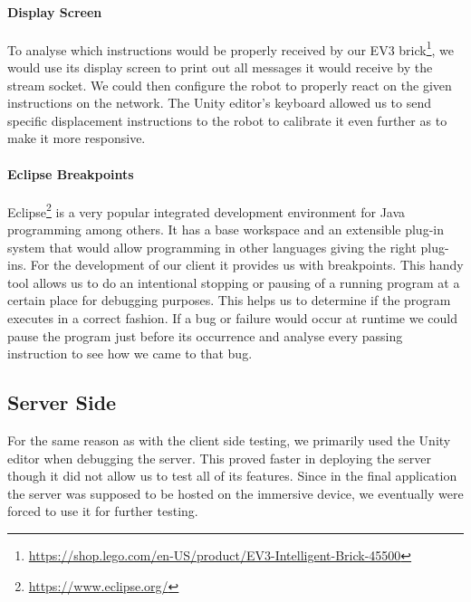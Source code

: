 \paragraph{Display Screen}
To analyse which instructions would be properly received by our EV3 brick\footnote{\protect\url{https://shop.lego.com/en-US/product/EV3-Intelligent-Brick-45500}}, we would use its display screen to print out all messages it would receive by the stream socket. We could then configure the robot to properly react on the given instructions on the network. The Unity editor's keyboard allowed us to send specific displacement instructions to the robot to calibrate it even further as to make it more responsive. 

\paragraph{Eclipse Breakpoints}
Eclipse\footnote{\protect\url{https://www.eclipse.org/}} is a very popular integrated development environment for Java programming among others. It has a base workspace and an extensible plug-in system that would allow programming in other languages giving the right plug-ins.
For the development of our client it provides us with breakpoints. This handy tool allows us to do an intentional stopping or pausing of a running program at a certain place for debugging purposes. This helps us to determine if the program executes in a correct fashion. If a bug or failure would occur at runtime we could pause the program just before its occurrence and analyse every passing instruction to see how we came to that bug. 

\subsection{Server Side}
For the same reason as with the client side testing, we primarily used the Unity editor when debugging the server. This proved faster in deploying the server though it did not allow us to test all of its features. Since in the final application the server was supposed to be hosted on the immersive device, we eventually were forced to use it for further testing.


